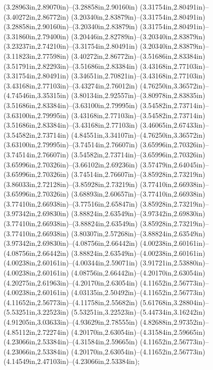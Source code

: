 (3.28963in,2.89070in)--(3.28858in,2.90160in) (3.31754in,2.80491in)--(3.40272in,2.86772in) (3.20340in,2.83879in)--(3.31754in,2.80491in) (3.28858in,2.90160in)--(3.20340in,2.83879in) (3.31754in,2.80491in)--(3.31860in,2.79400in) (3.20446in,2.82789in)--(3.20340in,2.83879in) (3.23237in,2.74210in)--(3.31754in,2.80491in) (3.20340in,2.83879in)--(3.11823in,2.77598in) (3.40272in,2.86772in)--(3.51686in,2.83384in) (3.51791in,2.82293in)--(3.51686in,2.83384in) (3.43168in,2.77103in)--(3.31754in,2.80491in) (3.34651in,2.70821in)--(3.43168in,2.77103in) (3.43168in,2.77103in)--(3.43274in,2.76012in) (4.76250in,3.36572in)--(4.74546in,3.35315in) (3.80134in,2.92557in)--(3.80978in,2.83835in) (3.51686in,2.83384in)--(3.63100in,2.79995in) (3.54582in,2.73714in)--(3.63100in,2.79995in) (3.43168in,2.77103in)--(3.54582in,2.73714in) (3.51686in,2.83384in)--(3.43168in,2.77103in) (3.46065in,2.67433in)--(3.54582in,2.73714in) (4.84551in,3.34107in)--(4.76250in,3.36572in) (3.63100in,2.79995in)--(3.74514in,2.76607in) (3.65996in,2.70326in)--(3.74514in,2.76607in) (3.54582in,2.73714in)--(3.65996in,2.70326in) (3.65996in,2.70326in)--(3.66102in,2.69236in) (3.57479in,2.64045in)--(3.65996in,2.70326in) (3.74514in,2.76607in)--(3.85928in,2.73219in) (3.86033in,2.72128in)--(3.85928in,2.73219in) (3.77410in,2.66938in)--(3.65996in,2.70326in) (3.68893in,2.60657in)--(3.77410in,2.66938in) (3.77410in,2.66938in)--(3.77516in,2.65847in) (3.85928in,2.73219in)--(3.97342in,2.69830in) (3.88824in,2.63549in)--(3.97342in,2.69830in) (3.77410in,2.66938in)--(3.88824in,2.63549in) (3.85928in,2.73219in)--(3.77410in,2.66938in) (3.80307in,2.57268in)--(3.88824in,2.63549in) (3.97342in,2.69830in)--(4.08756in,2.66442in) (4.00238in,2.60161in)--(4.08756in,2.66442in) (3.88824in,2.63549in)--(4.00238in,2.60161in) (4.00238in,2.60161in)--(4.00344in,2.59071in) (3.91721in,2.53880in)--(4.00238in,2.60161in) (4.08756in,2.66442in)--(4.20170in,2.63054in) (4.20275in,2.61963in)--(4.20170in,2.63054in) (4.11652in,2.56773in)--(4.00238in,2.60161in) (4.03135in,2.50492in)--(4.11652in,2.56773in) (4.11652in,2.56773in)--(4.11758in,2.55682in) (5.61768in,3.28804in)--(5.53251in,3.22523in) (5.53251in,3.22523in)--(5.44734in,3.16242in) (4.91205in,3.03633in)--(4.93629in,2.78555in) (4.82688in,2.97352in)--(4.85112in,2.72274in) (4.20170in,2.63054in)--(4.31584in,2.59665in) (4.23066in,2.53384in)--(4.31584in,2.59665in) (4.11652in,2.56773in)--(4.23066in,2.53384in) (4.20170in,2.63054in)--(4.11652in,2.56773in) (4.14549in,2.47103in)--(4.23066in,2.53384in);
